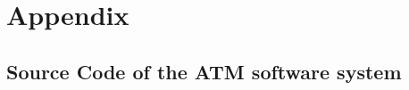 \chapter{Appendix}

\section{Source Code of the ATM software system}

\begin{lstlisting}[style=java, caption=class ATM , label=lst:classATM]

\end{lstlisting}